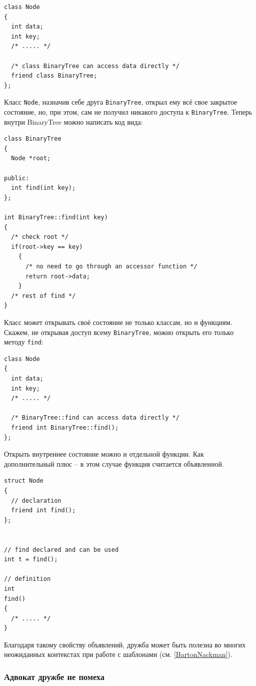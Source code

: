 \documentclass[a4paper,12pt,oneside]{article}
\begin{document}
\begin{lstlisting}
class Node
{
  int data;
  int key;
  /* ..... */

  /* class BinaryTree can access data directly */
  friend class BinaryTree; 
};
\end{lstlisting}


Класс \lstinline!Node!, назначив себе друга \lstinline!BinaryTree!, открыл ему всё свое закрытое состояние, но, при этом, сам не получил никакого доступа к \lstinline!BinaryTree!. Теперь внутри BinaryTree можно написать код вида:

\begin{lstlisting}
class BinaryTree
{
  Node *root;

public:
  int find(int key);
};

int BinaryTree::find(int key)
{
  /* check root */
  if(root->key == key)
    {
      /* no need to go through an accessor function */
      return root->data;
    }
  /* rest of find */
}
\end{lstlisting}


Класс может открывать своё состояние не только классам, но и функциям. Скажем, не открывая доступ всему \lstinline!BinaryTree!, можно открыть его только методу \lstinline!find!:

\begin{lstlisting}
class Node
{
  int data;
  int key;
  /* ..... */

  /* BinaryTree::find can access data directly */
  friend int BinaryTree::find();
};
\end{lstlisting}

Открыть внутреннее состояние можно и отдельной функции. Как дополнительный плюс -- в этом случае функция считается объявленной.

\begin{lstlisting}
struct Node
{
  // declaration
  friend int find();
};


// find declared and can be used
int t = find();

// definition
int
find() 
{
  /* ..... */
}
\end{lstlisting}

Благодаря такому свойству объявлений, дружба может быть полезна во многих неожиданных контекстах при работе с шаблонами (см. \ref{BartonNackman}).

\subsubsection{Адвокат дружбе не помеха}
\end{document}
